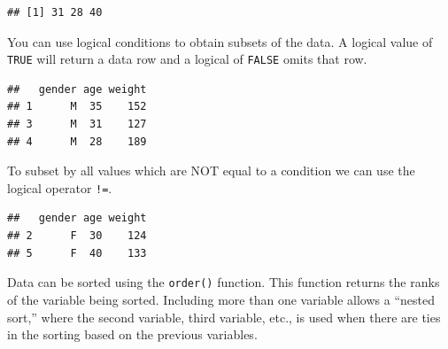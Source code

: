 \documentclass[
]{book}
\newenvironment{Shaded}{\begin{snugshade}}{\end{snugshade}}
\newcommand{\DecValTok}[1]{\textcolor[rgb]{0.00,0.00,0.81}{#1}}
\newcommand{\KeywordTok}[1]{\textcolor[rgb]{0.13,0.29,0.53}{\textbf{#1}}}
\newcommand{\NormalTok}[1]{#1}
\newcommand{\OperatorTok}[1]{\textcolor[rgb]{0.81,0.36,0.00}{\textbf{#1}}}
\newcommand{\StringTok}[1]{\textcolor[rgb]{0.31,0.60,0.02}{#1}}
\begin{document}
\begin{Shaded}
\end{Shaded}

\begin{verbatim}
## [1] 31 28 40
\end{verbatim}

You can use logical conditions to obtain subsets of the data. A logical value of \texttt{TRUE} will return a data row and a logical of \texttt{FALSE} omits that row.

\begin{Shaded}
\end{Shaded}

\begin{verbatim}
##   gender age weight
## 1      M  35    152
## 3      M  31    127
## 4      M  28    189
\end{verbatim}

To subset by all values which are NOT equal to a condition we can use the logical operator \texttt{!=}.

\begin{Shaded}
\end{Shaded}

\begin{verbatim}
##   gender age weight
## 2      F  30    124
## 5      F  40    133
\end{verbatim}

Data can be sorted using the \texttt{order()} function. This function returns the ranks of the variable being sorted. Including more than one variable allows a ``nested sort,'' where the second variable, third variable, etc., is used when there are ties in the sorting based on the previous variables.
\end{document}
